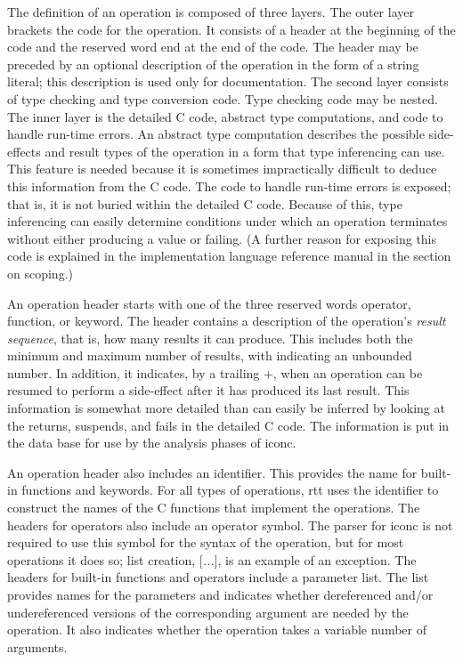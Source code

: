 The definition of an operation is composed of three layers. The outer
layer brackets the code for the operation. It consists of a header at
the beginning of the code and the reserved word end at the end of the
code. The header may be preceded by an optional description of the
operation in the form of a string literal; this description is used
only for documentation. The second layer consists of type checking and
type conversion code. Type checking code may be nested.  The inner
layer is the detailed C code, abstract type computations, and code to
handle run-time errors. An abstract type computation describes the
possible side-effects and result types of the operation in a form that
type inferencing can use. This feature is needed because it is
sometimes impractically difficult to deduce this information from the
C code. The code to handle run-time errors is exposed; that is, it is
not buried within the detailed C code. Because of this, type
inferencing can easily determine conditions under which an operation
terminates without either producing a value or failing. (A further
reason for exposing this code is explained in the implementation
language reference manual in the section on scoping.)

An operation header starts with one of the three reserved words
operator, function, or keyword. The header contains a description of
the operation's \textit{result sequence}, that is, how many results it
can produce. This includes both the minimum and maximum number of
results, with indicating an unbounded number. In addition, it
indicates, by a trailing +, when an operation can be resumed to
perform a side-effect after it has produced its last result. This
information is somewhat more detailed than can easily be inferred by
looking at the returns, suspends, and fails in the detailed C
code. The information is put in the data base for use by the analysis
phases of iconc.

An operation header also includes an identifier. This provides the
name for built-in functions and keywords. For all types of operations,
rtt uses the identifier to construct the names of the C functions that
implement the operations.  The headers for operators also include an
operator symbol. The parser for iconc is not required to use this
symbol for the syntax of the operation, but for most operations it
does so; list creation, [\textit{...}], is an example of an
exception. The headers for built-in functions and operators include a
parameter list. The list provides names for the parameters and
indicates whether dereferenced and/or undereferenced versions of the
corresponding argument are needed by the operation. It also indicates
whether the operation takes a variable number of arguments.


